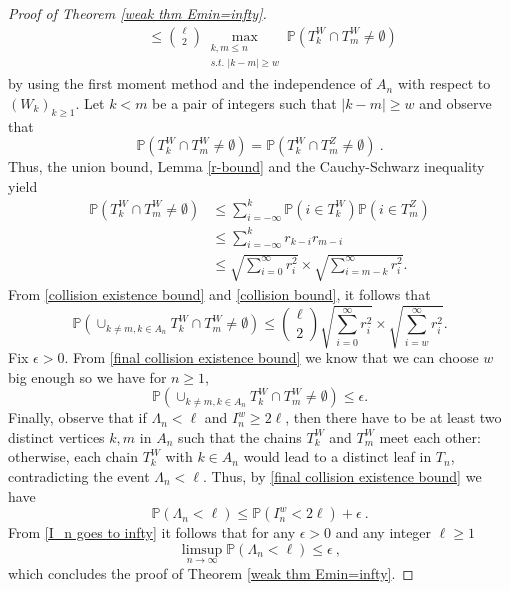 \documentclass[12pt]{article}
\numberwithin{equation}{section} \font\titre=cmbx12
\newcommand{\prob}[1]{\mathbb{P}\left( #1 \right)}
\newcommand{\leaves}{\Lambda}
\begin{document}
\begin{proof}[Proof of Theorem \ref{weak thm Emin=infty}]
\begin{align}
        &\quad\le {\ell\choose 2} \max_{\substack{k,m\le n\\ \textit{s.t. } |k-m|\ge w} }\prob{T_k^W\cap T_m^W \neq \emptyset} \label{collision existence bound}
    \end{align}
    by using the first moment method and the independence of $A_n$ with respect to $(W_k)_{k\ge 1}$. Let $k<m$ be a pair of integers such that $|k-m|\ge w$ and observe that $$\prob{T_k^W\cap T_m^W \neq \emptyset}=\prob{T_k^W\cap T_m^Z \neq \emptyset}~.$$
    Thus, the union bound, Lemma \ref{r-bound} and the Cauchy-Schwarz inequality yield
    \begin{align}
        \prob{T_k^W\cap T_m^W \neq \emptyset} &\le \sum_{i=-\infty}^k \prob{i\in T_k^W}\prob{i\in T_m^Z} \nonumber \\
        &\le \sum_{i=-\infty}^k r_{k-i}r_{m-i}  \nonumber \\
        &\le \sqrt{\sum_{i=0}^\infty r_i^2} \times\sqrt{\sum_{i=m-k}^\infty r_i^2}. \label{collision bound}
    \end{align}
    From \eqref{collision existence bound} and \eqref{collision bound}, it follows that 
\begin{equation}
    \prob{\cup_{k\neq m, k \in A_n}  T_k^W\cap T_m^W\neq \emptyset} \le {\ell\choose 2}\sqrt{\sum_{i=0}^\infty r_i^2} \times\sqrt{\sum_{i=w}^\infty r_i^2}.\label{final collision existence bound}
    \end{equation}
    Fix $\epsilon > 0 $. From \eqref{final collision existence bound} we know that we can choose $w$ big enough so we have  for $n\ge 1$,
    \begin{equation}
        \prob{\cup_{k\neq m, k \in A_n}  T_k^W\cap T_m^W\neq \emptyset}\le \epsilon.
    \end{equation}
    Finally, observe that if $\leaves_n < \ell$ and $I_n^w\ge 2\ell$, then there have to be at least two distinct vertices $k,m$ in $A_n$ such that the chains $T_k^W$ and $T_m^W$ meet each other: otherwise, each chain $T_k^W$ with $k\in A_n$ would lead to a distinct leaf in $T_n$, contradicting the event $\leaves_n<\ell$. Thus, by \eqref{final collision existence bound} we have
    $$\prob{\leaves_n<\ell} \le \prob{I_n^w < 2\ell} + \epsilon~.$$
    From \eqref{I_n goes to infty} it follows that for any $\epsilon >0 $ and any integer $\ell\ge 1$
    $$\limsup_{n\to \infty} \prob{\leaves_n<\ell} \le \epsilon~,$$
    which concludes the proof of Theorem \ref{weak thm Emin=infty}.
    \end{proof}
\end{document}
